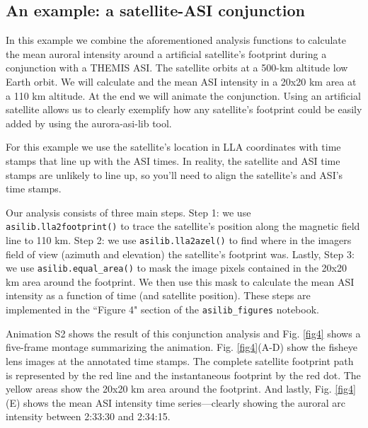 \documentclass[utf8]{FrontiersinHarvard} %
\begin{document}
\subsection{An example: a satellite-ASI conjunction}\label{satellite_conjunction}
In this example we combine the aforementioned analysis functions to calculate the mean auroral intensity around a artificial satellite's footprint during a conjunction with a THEMIS ASI. The satellite orbits at a 500-km altitude low Earth orbit. We will calculate and the mean ASI intensity in a 20x20 km area at a 110 km altitude. At the end we will animate the conjunction. Using an artificial satellite allows us to clearly exemplify how any satellite's footprint could be easily added by using the aurora-asi-lib tool. 

For this example we use the satellite's location in LLA coordinates with time stamps that line up with the ASI times. In reality, the satellite and ASI time stamps are unlikely to line up, so you'll need to align the satellite's and ASI's time stamps.

Our analysis consists of three main steps. Step 1: we use \verb|asilib.lla2footprint()| to trace the satellite's position along the magnetic field line to 110 km. Step 2: we use \verb|asilib.lla2azel()| to find where in the imagers field of view (azimuth and elevation) the satellite's footprint was. Lastly, Step 3: we use \verb|asilib.equal_area()| to mask the image pixels contained in the 20x20 km area around the footprint. We then use this mask to calculate the mean ASI intensity as a function of time (and satellite position). These steps are implemented in the ``Figure 4" section of the \verb|asilib_figures| notebook.

Animation S2 shows the result of this conjunction analysis and Fig. \ref{fig4} shows a five-frame montage summarizing the animation. Fig. \ref{fig4}(A-D) show the fisheye lens images at the annotated time stamps. The complete satellite footprint path is represented by the red line and the instantaneous footprint by the red dot. The yellow areas show the 20x20 km area around the footprint. And lastly, Fig. \ref{fig4}(E) shows the mean ASI intensity time series---clearly showing the auroral arc intensity between 2:33:30 and 2:34:15.
\end{document}

